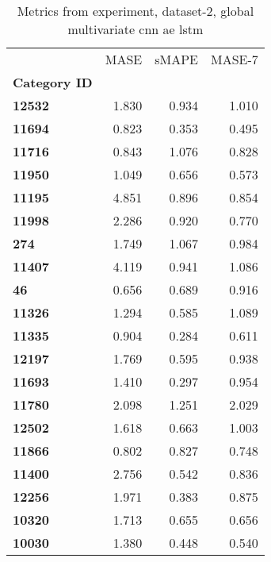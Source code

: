 \begin{table}[h]
\centering
\caption{Metrics from experiment, dataset-2, global multivariate cnn ae lstm}
\label{table:global-multivariate-cnn-ae-lstm-dataset-2}
\begin{tabular}{lrrr}
\toprule
{} &   MASE &  sMAPE &  MASE-7 \\
\textbf{Category ID} &        &        &         \\
\midrule
\textbf{12532      } &  1.830 &  0.934 &   1.010 \\
\textbf{11694      } &  0.823 &  0.353 &   0.495 \\
\textbf{11716      } &  0.843 &  1.076 &   0.828 \\
\textbf{11950      } &  1.049 &  0.656 &   0.573 \\
\textbf{11195      } &  4.851 &  0.896 &   0.854 \\
\textbf{11998      } &  2.286 &  0.920 &   0.770 \\
\textbf{274        } &  1.749 &  1.067 &   0.984 \\
\textbf{11407      } &  4.119 &  0.941 &   1.086 \\
\textbf{46         } &  0.656 &  0.689 &   0.916 \\
\textbf{11326      } &  1.294 &  0.585 &   1.089 \\
\textbf{11335      } &  0.904 &  0.284 &   0.611 \\
\textbf{12197      } &  1.769 &  0.595 &   0.938 \\
\textbf{11693      } &  1.410 &  0.297 &   0.954 \\
\textbf{11780      } &  2.098 &  1.251 &   2.029 \\
\textbf{12502      } &  1.618 &  0.663 &   1.003 \\
\textbf{11866      } &  0.802 &  0.827 &   0.748 \\
\textbf{11400      } &  2.756 &  0.542 &   0.836 \\
\textbf{12256      } &  1.971 &  0.383 &   0.875 \\
\textbf{10320      } &  1.713 &  0.655 &   0.656 \\
\textbf{10030      } &  1.380 &  0.448 &   0.540 \\
\bottomrule
\end{tabular}
\end{table}
